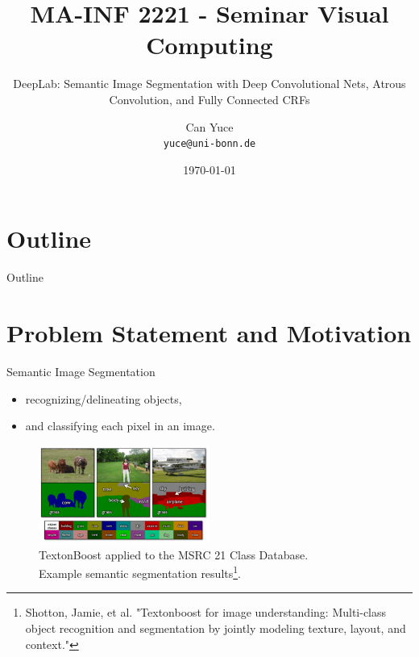 \documentclass{beamer}
\title[Seminar Visual Computing] %
{MA-INF 2221 - Seminar Visual Computing}
\subtitle {DeepLab: Semantic Image Segmentation with Deep Convolutional Nets, Atrous Convolution, and Fully Connected CRFs }
\author[Can Yuce]{Can Yuce\inst{1} \\
	 \texttt{yuce@uni-bonn.de}}
\institute[University of Bonn] 
{
	\inst{1}
	Department of Informatics\\
	University of Bonn
}
\date{\today}
\begin{document}
\begin{frame}
	\titlepage
\end{frame}

\section{Outline}

\begin{frame}{Outline}
  \tableofcontents
\end{frame}

\section{Problem Statement and Motivation}

\begin{frame}{Semantic Image Segmentation}
\begin{itemize}
	\item recognizing/delineating objects,
	\item and classifying each pixel in an image.
\end{itemize}
\begin{figure}
	\centering
	\includegraphics[width=0.5\textwidth]{figure/ss2.png}
	\captionsetup{justification=centering}
	\caption{TextonBoost applied to the MSRC 21 Class Database.\\Example semantic segmentation results\footnote{Shotton, Jamie, et al. "Textonboost for image understanding: Multi-class \\object recognition and segmentation by jointly modeling texture, layout, and context."}.\label{label1}}
\end{figure}
\end{frame}
\end{document}
